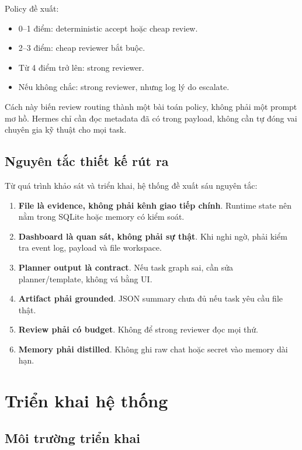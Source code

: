 \documentclass[12pt,a4paper]{article}
\begin{document}
Policy đề xuất:

\begin{itemize}
    \item 0--1 điểm: deterministic accept hoặc cheap review.
    \item 2--3 điểm: cheap reviewer bắt buộc.
    \item Từ 4 điểm trở lên: strong reviewer.
    \item Nếu không chắc: strong reviewer, nhưng log lý do escalate.
\end{itemize}

Cách này biến review routing thành một bài toán policy, không phải một prompt mơ hồ. Hermes chỉ cần đọc metadata đã có trong payload, không cần tự đóng vai chuyên gia kỹ thuật cho mọi task.

\subsection{Nguyên tắc thiết kế rút ra}

Từ quá trình khảo sát và triển khai, hệ thống đề xuất sáu nguyên tắc:

\begin{enumerate}
    \item \textbf{File là evidence, không phải kênh giao tiếp chính}. Runtime state nên nằm trong SQLite hoặc memory có kiểm soát.
    \item \textbf{Dashboard là quan sát, không phải sự thật}. Khi nghi ngờ, phải kiểm tra event log, payload và file workspace.
    \item \textbf{Planner output là contract}. Nếu task graph sai, cần sửa planner/template, không vá bằng UI.
    \item \textbf{Artifact phải grounded}. JSON summary chưa đủ nếu task yêu cầu file thật.
    \item \textbf{Review phải có budget}. Không để strong reviewer đọc mọi thứ.
    \item \textbf{Memory phải distilled}. Không ghi raw chat hoặc secret vào memory dài hạn.
\end{enumerate}

\section{Triển khai hệ thống}

\subsection{Môi trường triển khai}
\end{document}
